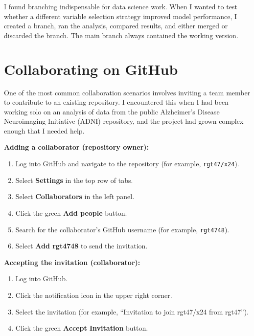 \documentclass[
  letterpaper,
  DIV=11,
  numbers=noendperiod]{scrartcl}
\providecommand{\tightlist}{%
  \setlength{\itemsep}{0pt}\setlength{\parskip}{0pt}}
\begin{document}
I found branching indispensable for data science work. When I wanted to
test whether a different variable selection strategy improved model
performance, I created a branch, ran the analysis, compared results, and
either merged or discarded the branch. The main branch always contained
the working version.

\section{Collaborating on GitHub}\label{collaborating-on-github}

One of the most common collaboration scenarios involves inviting a team
member to contribute to an existing repository. I encountered this when
I had been working solo on an analysis of data from the public
Alzheimer's Disease Neuroimaging Initiative (ADNI) repository, and the
project had grown complex enough that I needed help.

\textbf{Adding a collaborator (repository owner):}

\begin{enumerate}
\def\labelenumi{\arabic{enumi}.}
\tightlist
\item
  Log into GitHub and navigate to the repository (for example,
  \texttt{rgt47/x24}).
\item
  Select \textbf{Settings} in the top row of tabs.
\item
  Select \textbf{Collaborators} in the left panel.
\item
  Click the green \textbf{Add people} button.
\item
  Search for the collaborator's GitHub username (for example,
  \texttt{rgt4748}).
\item
  Select \textbf{Add rgt4748} to send the invitation.
\end{enumerate}

\textbf{Accepting the invitation (collaborator):}

\begin{enumerate}
\def\labelenumi{\arabic{enumi}.}
\tightlist
\item
  Log into GitHub.
\item
  Click the notification icon in the upper right corner.
\item
  Select the invitation (for example, ``Invitation to join rgt47/x24
  from rgt47'').
\item
  Click the green \textbf{Accept Invitation} button.
\end{enumerate}
\end{document}
